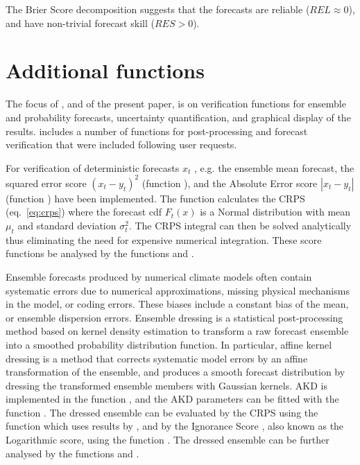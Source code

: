 \documentclass[article]{jss}\usepackage{graphicx, color}
\begin{document}
%
The Brier Score decomposition suggests that the forecasts are reliable ($REL\approx 0$), and have non-trivial forecast skill ($RES > 0$). 


\section{Additional functions}

The focus of , and of the present paper, is on verification functions for ensemble and probability forecasts, uncertainty quantification, and graphical display of the results.
 includes a number of functions for post-processing and forecast verification that were included following user requests.


For verification of deterministic forecasts $x_t$ , e.g. the ensemble mean forecast, the squared error score $(x_t - y_t)^2$ (function ), and the Absolute Error score $|x_t - y_t|$ (function ) have been implemented.
The function  calculates the CRPS (eq.~\ref{eq:crps}) where the forecast cdf $F_t(x)$ is a Normal distribution with mean $\mu_t$ and standard deviation $\sigma^2_t$.
The CRPS integral can then be solved analytically \citep{gneiting2005calibrated} thus eliminating the need for expensive numerical integration.
These score functions be analysed by the functions  and .


Ensemble forecasts produced by numerical climate models often contain systematic errors due to numerical approximations, missing physical mechanisms in the model, or coding errors.
These biases include a constant bias of the mean, or ensemble dispersion errors.
Ensemble dressing is a statistical post-processing method based on kernel density estimation to transform a raw forecast ensemble into a smoothed probability distribution function.
In particular, affine kernel dressing \citep[AKD; ][]{broecker2008from} is a method that corrects systematic model errors by an affine transformation of the ensemble, and produces a smooth forecast distribution by dressing the transformed ensemble members with Gaussian kernels.
AKD is implemented in the function , and the AKD parameters can be fitted with the function . 
The dressed ensemble can be evaluated by the CRPS using the function  which uses results by \citet{grimit2006the}, and by the Ignorance Score \citep{roulston2002evaluating}, also known as the Logarithmic score, using the function .
The dressed ensemble can be further analysed by the functions  and .
\end{document}
